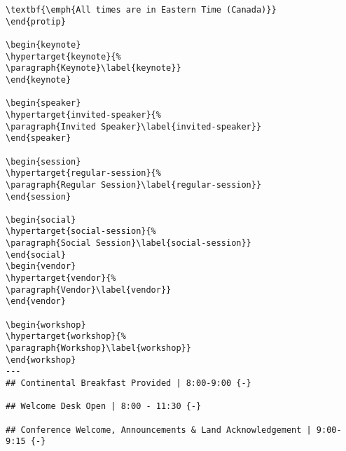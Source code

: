 \documentclass[
]{book}
\begin{document}
\begin{verbatim}
\textbf{\emph{All times are in Eastern Time (Canada)}}
\end{protip}

\begin{keynote}
\hypertarget{keynote}{%
\paragraph{Keynote}\label{keynote}}
\end{keynote}

\begin{speaker}
\hypertarget{invited-speaker}{%
\paragraph{Invited Speaker}\label{invited-speaker}}
\end{speaker}

\begin{session}
\hypertarget{regular-session}{%
\paragraph{Regular Session}\label{regular-session}}
\end{session}

\begin{social}
\hypertarget{social-session}{%
\paragraph{Social Session}\label{social-session}}
\end{social}
\begin{vendor}
\hypertarget{vendor}{%
\paragraph{Vendor}\label{vendor}}
\end{vendor}

\begin{workshop}
\hypertarget{workshop}{%
\paragraph{Workshop}\label{workshop}}
\end{workshop}
---
## Continental Breakfast Provided | 8:00-9:00 {-}

## Welcome Desk Open | 8:00 - 11:30 {-}

## Conference Welcome, Announcements & Land Acknowledgement | 9:00-9:15 {-}


\end{verbatim}
\end{document}
